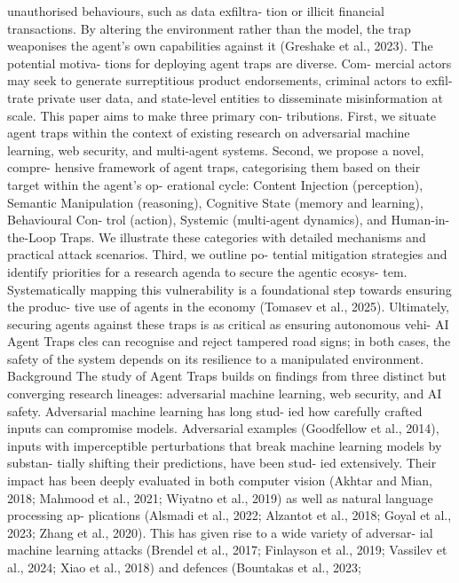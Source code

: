 unauthorised behaviours, such as data exfiltra-
tion or illicit financial transactions. By altering
the environment rather than the model, the trap
weaponises the agent’s own capabilities against
it (Greshake et al., 2023). The potential motiva-
tions for deploying agent traps are diverse. Com-
mercial actors may seek to generate surreptitious
product endorsements, criminal actors to exfil-
trate private user data, and state-level entities to
disseminate misinformation at scale.
This paper aims to make three primary con-
tributions. First, we situate agent traps within
the context of existing research on adversarial
machine learning, web security, and multi-agent
systems. Second, we propose a novel, compre-
hensive framework of agent traps, categorising
them based on their target within the agent’s op-
erational cycle: Content Injection (perception),
Semantic Manipulation (reasoning), Cognitive
State (memory and learning), Behavioural Con-
trol (action), Systemic (multi-agent dynamics),
and Human-in-the-Loop Traps.
We illustrate
these categories with detailed mechanisms and
practical attack scenarios. Third, we outline po-
tential mitigation strategies and identify priorities
for a research agenda to secure the agentic ecosys-
tem. Systematically mapping this vulnerability is
a foundational step towards ensuring the produc-
tive use of agents in the economy (Tomasev et al.,
2025). Ultimately, securing agents against these
traps is as critical as ensuring autonomous vehi-
AI Agent Traps
cles can recognise and reject tampered road signs;
in both cases, the safety of the system depends
on its resilience to a manipulated environment.
Background
The study of Agent Traps builds on findings from
three distinct but converging research lineages:
adversarial machine learning, web security, and
AI safety.
Adversarial machine learning has long stud-
ied how carefully crafted inputs can compromise
models. Adversarial examples (Goodfellow et al.,
2014), inputs with imperceptible perturbations
that break machine learning models by substan-
tially shifting their predictions, have been stud-
ied extensively. Their impact has been deeply
evaluated in both computer vision (Akhtar and
Mian, 2018; Mahmood et al., 2021; Wiyatno et al.,
2019) as well as natural language processing ap-
plications (Alsmadi et al., 2022; Alzantot et al.,
2018; Goyal et al., 2023; Zhang et al., 2020).
This has given rise to a wide variety of adversar-
ial machine learning attacks (Brendel et al., 2017;
Finlayson et al., 2019; Vassilev et al., 2024; Xiao
et al., 2018) and defences (Bountakas et al., 2023;
